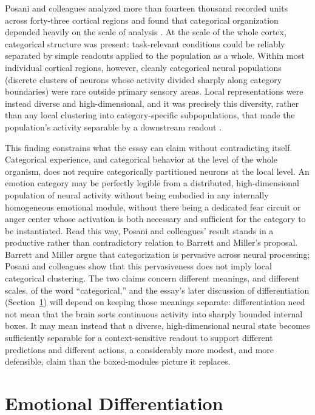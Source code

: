 \documentclass[11pt]{article}
\begin{document}
Posani and colleagues analyzed more than fourteen thousand recorded units across forty-three cortical regions and found that categorical organization depended heavily on the scale of analysis \citep{Posani2026}. At the scale of the whole cortex, categorical structure was present: task-relevant conditions could be reliably separated by simple readouts applied to the population as a whole. Within most individual cortical regions, however, cleanly categorical neural populations (discrete clusters of neurons whose activity divided sharply along category boundaries) were rare outside primary sensory areas. Local representations were instead diverse and high-dimensional, and it was precisely this diversity, rather than any local clustering into category-specific subpopulations, that made the population's activity separable by a downstream readout \citep{Posani2026}.

This finding constrains what the essay can claim without contradicting itself. Categorical experience, and categorical behavior at the level of the whole organism, does not require categorically partitioned neurons at the local level. An emotion category may be perfectly legible from a distributed, high-dimensional population of neural activity without being embodied in any internally homogeneous emotional module, without there being a dedicated fear circuit or anger center whose activation is both necessary and sufficient for the category to be instantiated. Read this way, Posani and colleagues' result stands in a productive rather than contradictory relation to Barrett and Miller's proposal. Barrett and Miller argue that categorization is pervasive across neural processing; Posani and colleagues show that this pervasiveness does not imply local categorical clustering. The two claims concern different meanings, and different scales, of the word ``categorical,'' and the essay's later discussion of differentiation (Section~\ref{sec:differentiation}) will depend on keeping those meanings separate: differentiation need not mean that the brain sorts continuous activity into sharply bounded internal boxes. It may mean instead that a diverse, high-dimensional neural state becomes sufficiently separable for a context-sensitive readout to support different predictions and different actions, a considerably more modest, and more defensible, claim than the boxed-modules picture it replaces.

\section{Emotional Differentiation}\label{sec:differentiation}
\end{document}
